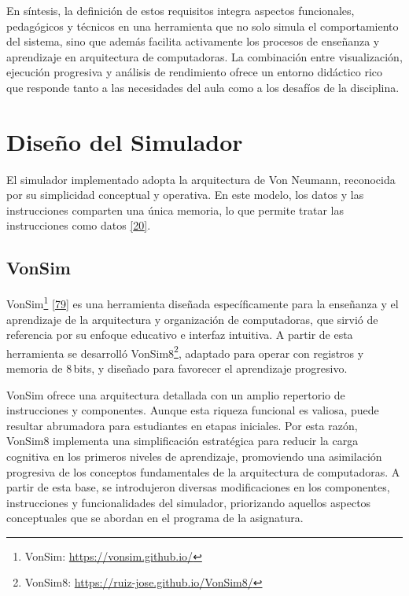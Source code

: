 \documentclass[12pt,oneside]{templates/unerthesis}
\begin{document}
En síntesis, la definición de estos requisitos integra aspectos funcionales, pedagógicos y técnicos en una herramienta que no solo simula el comportamiento del sistema, sino que además facilita activamente los procesos de enseñanza y aprendizaje en arquitectura de computadoras. La combinación entre visualización, ejecución progresiva y análisis de rendimiento ofrece un entorno didáctico rico que responde tanto a las necesidades del aula como a los desafíos de la disciplina.

\hypertarget{diseuxf1o-del-simulador}{%
\section{Diseño del Simulador}\label{diseuxf1o-del-simulador}}

El simulador implementado adopta la arquitectura de Von Neumann, reconocida por su simplicidad conceptual y operativa. En este modelo, los datos y las instrucciones comparten una única memoria, lo que permite tratar las instrucciones como datos \protect\hyperlink{ref-stallings_computer_2021}{{[}20{]}}.

\hypertarget{vonsim-1}{%
\subsection{VonSim}\label{vonsim-1}}

VonSim\footnote{VonSim: \url{https://vonsim.github.io/}} \protect\hyperlink{ref-vonsim}{{[}79{]}} es una herramienta diseñada específicamente para la enseñanza y el aprendizaje de la arquitectura y organización de computadoras, que sirvió de referencia por su enfoque educativo e interfaz intuitiva. A partir de esta herramienta se desarrolló VonSim8\footnote{VonSim8: \url{https://ruiz-jose.github.io/VonSim8/}}, adaptado para operar con registros y memoria de 8\,bits, y diseñado para favorecer el aprendizaje progresivo.

VonSim ofrece una arquitectura detallada con un amplio repertorio de instrucciones y componentes. Aunque esta riqueza funcional es valiosa, puede resultar abrumadora para estudiantes en etapas iniciales. Por esta razón, VonSim8 implementa una simplificación estratégica para reducir la carga cognitiva en los primeros niveles de aprendizaje, promoviendo una asimilación progresiva de los conceptos fundamentales de la arquitectura de computadoras. A partir de esta base, se introdujeron diversas modificaciones en los componentes, instrucciones y funcionalidades del simulador, priorizando aquellos aspectos conceptuales que se abordan en el programa de la asignatura.
\end{document}
